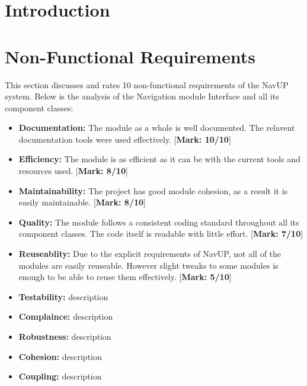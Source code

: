 \documentclass[runningheads,a4paper]{article}
\begin{document}



\begingroup



\tableofcontents


\endgroup

\newpage

\section{Introduction}

	\section{Non-Functional Requirements}
	
	This section discusses and rates 10 non-functional requirements of the NavUP system.
	Below is the analysis of the Navigation module Interface and all its component classes:
	
	\begin{itemize}
		\item \textbf{Documentation:}
			The module as a whole is well documented. The relavent documentation tools were used effectively. [\textbf{Mark: 10/10}]
			
		\item \textbf{Efficiency:} The module is as efficient as it can be with the current tools and resources used. [\textbf{Mark: 8/10}]
		
		\item \textbf{Maintainability:} The project has good module cohesion, as a result it is easily maintainable. [\textbf{Mark: 8/10}]
		
		\item \textbf{Quality:} The module follows a consistent coding standard throughout all its component classes. The code itself is readable with little effort. [\textbf{Mark: 7/10}]
		
		\item \textbf{Reuseablity:} Due to the explicit requirements of NavUP, not all of the modules are easily reuseable. However slight tweaks to some modules is enough to be able to reuse them effectively. [\textbf{Mark: 5/10}]
		
		\item \textbf{Testability:} description
		\item \textbf{Complaince:} description
		\item \textbf{Robustness:} description
		\item \textbf{Cohesion:} description
		\item \textbf{Coupling:} description\\
		
	\end{itemize}
\end{document}
